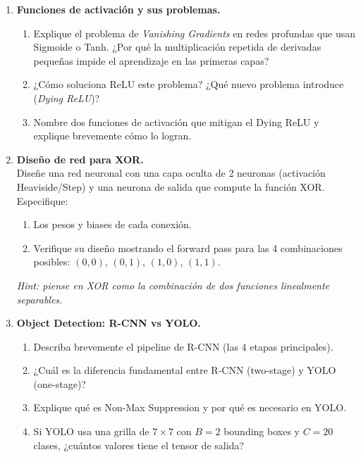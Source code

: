 \documentclass[12pt,a4paper]{article}
\begin{document}
\begin{enumerate}[label=\arabic*)]
    \item \textbf{Funciones de activación y sus problemas.} \\
    \begin{enumerate}[label=\alph*)]
        \item Explique el problema de \textit{Vanishing Gradients} en redes profundas que usan Sigmoide o Tanh. ¿Por qué la multiplicación repetida de derivadas pequeñas impide el aprendizaje en las primeras capas?
        \item ¿Cómo soluciona ReLU este problema? ¿Qué nuevo problema introduce (\textit{Dying ReLU})?
        \item Nombre dos funciones de activación que mitigan el Dying ReLU y explique brevemente cómo lo logran.
    \end{enumerate}

    \item \textbf{Diseño de red para XOR.} \\
    Diseñe una red neuronal con una capa oculta de 2 neuronas (activación Heaviside/Step) y una neurona de salida que compute la función XOR. Especifique:
    \begin{enumerate}[label=\alph*)]
        \item Los pesos y biases de cada conexión.
        \item Verifique su diseño mostrando el forward pass para las 4 combinaciones posibles: $(0,0)$, $(0,1)$, $(1,0)$, $(1,1)$.
    \end{enumerate}
    \textit{Hint: piense en XOR como la combinación de dos funciones linealmente separables.}

    \item \textbf{Object Detection: R-CNN vs YOLO.} \\
    \begin{enumerate}[label=\alph*)]
        \item Describa brevemente el pipeline de R-CNN (las 4 etapas principales).
        \item ¿Cuál es la diferencia fundamental entre R-CNN (two-stage) y YOLO (one-stage)?
        \item Explique qué es Non-Max Suppression y por qué es necesario en YOLO.
        \item Si YOLO usa una grilla de $7 \times 7$ con $B=2$ bounding boxes y $C=20$ clases, ¿cuántos valores tiene el tensor de salida?
    \end{enumerate}
\end{enumerate}
\end{document}
